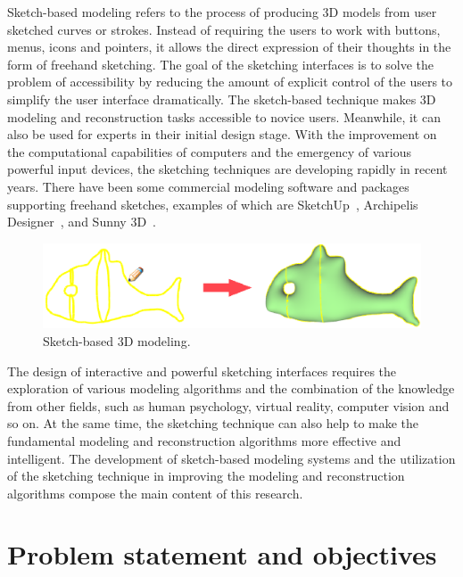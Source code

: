 Sketch-based modeling refers to the process  of producing 3D models
from user sketched curves or strokes. Instead of requiring the users
to work with buttons, menus, icons and pointers, it allows the
direct expression of their thoughts in the form of freehand
sketching. The goal of the sketching interfaces is to solve the
problem of accessibility by reducing the amount of explicit control
of the users to simplify the user interface dramatically. The
sketch-based technique makes 3D modeling and reconstruction tasks
accessible to novice users. Meanwhile, it can also be used for
experts in their initial design stage. With the improvement on the
computational capabilities of computers and the emergency of various
powerful input devices, the sketching techniques are developing
rapidly in recent years. There have been some commercial modeling
software and packages supporting freehand sketches, examples of
which are SketchUp~\cite{SketchUp}, Archipelis
Designer~\cite{ArcDes}, and Sunny 3D~\cite{Sunny3D}.

\begin{figure} [htbp]
    \centering
  \includegraphics[scale=0.6]{figs/f1.sketch.eps}
  \caption{Sketch-based 3D modeling.}
\end{figure}

The design of interactive and  powerful sketching interfaces
requires the exploration of various modeling algorithms and the
combination of the knowledge from other fields, such as human
psychology, virtual reality, computer vision and so on. At the same
time, the sketching technique can also help to make the fundamental
modeling and reconstruction algorithms more effective and
intelligent. The development of sketch-based modeling systems and
the utilization of the sketching technique in improving the modeling
and reconstruction algorithms compose the main content of this
research.


\section{Problem statement and objectives}

